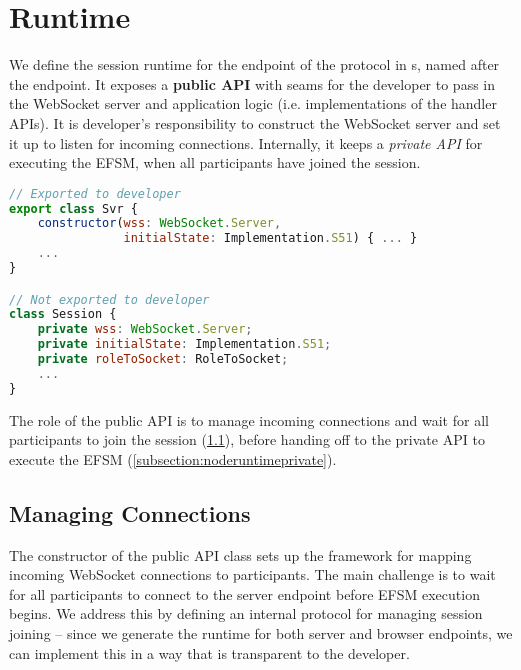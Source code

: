 \section{Runtime}
\label{section:noderuntime}

We define the session runtime for the  endpoint
of the  protocol in s,
named after the endpoint.
It exposes a \textbf{public API}
with seams for the developer to pass in the WebSocket server 
and application logic
(i.e. implementations of the handler APIs).
It is developer's responsibility to construct the
WebSocket server and set it up to listen for incoming connections.
Internally, it keeps a \textit{private API}
for executing the EFSM, when all participants have 
joined the session.

\begin{lstlisting}[language=javascript]
// Exported to developer
export class Svr {
	constructor(wss: WebSocket.Server,
				initialState: Implementation.S51) { ... }
	...
}

// Not exported to developer
class Session {
	private wss: WebSocket.Server;
	private initialState: Implementation.S51;
	private roleToSocket: RoleToSocket;
	...
}
\end{lstlisting}

The role of the public API is to manage incoming connections and
wait for all participants to join the session 
(\cref{subsection:noderuntimepublic}), before
handing off to the private API to execute the EFSM
(\cref{subsection:noderuntimeprivate}).

\subsection{Managing Connections}
\label{subsection:noderuntimepublic}

The constructor of the public API class sets up
the framework for mapping incoming WebSocket connections to
participants. 
The main challenge is to wait for all participants to 
connect to the server endpoint before EFSM execution begins.
We address this by defining an internal protocol for managing
session joining -- since we generate the runtime for both server 
and browser endpoints, we can implement this in a way that is 
transparent to the developer.


